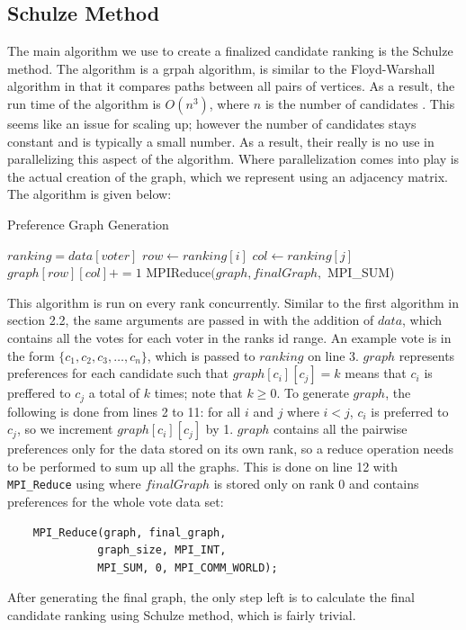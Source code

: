 \documentclass[final,5p,times,twocolumn,authoryear, 10pt]{elsarticle}
\newcommand{\C}[1]{\lstinline{#1}}
\begin{document}
\subsection{Schulze Method}
\label{Schulze Method}
The main algorithm we use to create a finalized candidate ranking is the
Schulze method. The algorithm is a grpah algorithm, is similar to the
Floyd-Warshall algorithm in that it compares paths between all pairs of
vertices. As a result, the run time of the algorithm is $O(n^3)$, where $n$ is
the number of candidates \cite{schulze1}. This seems like an issue for scaling
up; however the number of candidates stays constant and is typically a small
number. As a result, their really is no use in parallelizing this aspect of the
algorithm. Where parallelization comes into play is the actual creation of the
graph, which we represent using an adjacency matrix. The algorithm is given
below:
\begin{algorithm}[H]
    \caption{Preference Graph Generation}\label{alg:cap}
    \begin{algorithmic}[1]
        \State $ranking = data[voter]$ 
            \State $row \gets ranking[i]$
            \State $col \gets ranking[j]$
            \State $graph[row][col] += 1$
            \EndFor
        \EndFor
    \EndFor
    \State MPIReduce$(graph, finalGraph,$ MPI\_SUM)
    \EndProcedure
    \end{algorithmic}
\end{algorithm}

This algorithm is run on every rank concurrently. Similar to the first
algorithm in section 2.2, the same arguments are passed in with the addition of
$data$, which contains all the votes for each voter in the ranks id range. An
example vote is in the form $\{c_1, c_2, c_3, \ldots, c_n\}$, which is passed
to $ranking$ on line 3. $graph$ represents preferences for each candidate such
that $graph[c_i][c_j] = k$ means that $c_i$ is preffered to $c_j$ a total of
$k$ times; note that $k \geq 0$. To generate $graph$, the following is done
from lines 2 to 11: for all $i$ and $j$ where $i < j$, $c_i$ is preferred to
$c_j$, so we increment $graph[c_i][c_j]$ by 1. $graph$ contains all the
pairwise preferences only for the data stored on its own rank, so a reduce
operation needs to be performed to sum up all the graphs. This is done on line
12 with \C{MPI_Reduce} using where $finalGraph$ is stored only on rank 0 and
contains preferences for the whole vote data set:
\begin{center}
    \begin{BVerbatim}
    MPI_Reduce(graph, final_graph, 
              graph_size, MPI_INT,
              MPI_SUM, 0, MPI_COMM_WORLD);
    \end{BVerbatim}
\end{center}
After generating the final graph, the only step left is to calculate the final
candidate ranking using Schulze method, which is fairly trivial.
\end{document}
